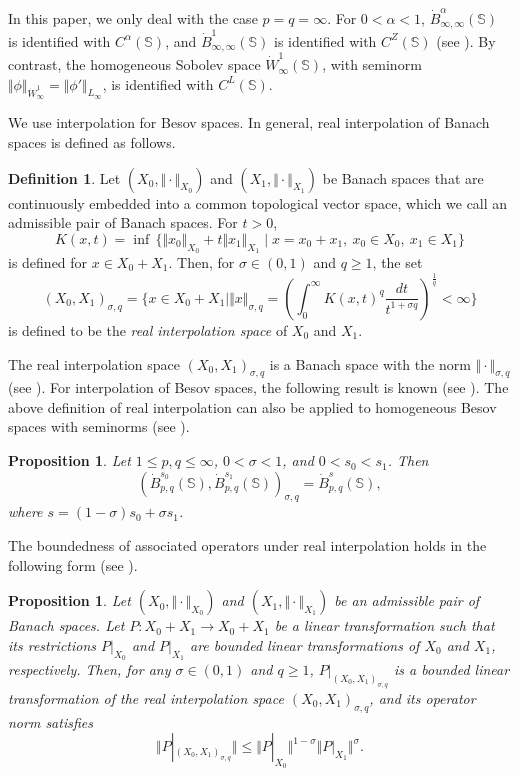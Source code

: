 \documentclass[amstex]{amsart}
\newtheorem{proposition}[theorem]{Proposition}
\theoremstyle{definition}
\newtheorem{definition}[theorem]{Definition}
\theoremstyle{remark}
\numberwithin{equation}{section}
\begin{document}
In this paper, we only deal with the case $p=q=\infty$. For $0<\alpha<1$, $\dot B^\alpha_{\infty,\infty}(\mathbb S)$ is
identified with $C^\alpha(\mathbb S)$, and $\dot B^1_{\infty,\infty}(\mathbb S)$ is
identified with $C^Z(\mathbb S)$ (see \cite[p.541]{Leo}). 
By contrast, the homogeneous Sobolev space $\dot W^1_\infty(\mathbb S)$,
with seminorm $\Vert \phi \Vert_{\dot W^1_\infty}=\Vert \phi' \Vert_{L_\infty}$, is identified with $C^L(\mathbb S)$. 

We use interpolation for Besov spaces.
In general, real interpolation of Banach spaces is defined as follows.

\begin{definition}
Let $(X_0, \Vert \cdot \Vert_{X_0})$ and $(X_1, \Vert \cdot \Vert_{X_1})$ 
be Banach spaces that are continuously embedded into a common topological vector space,
which we call an admissible pair of Banach spaces. For $t>0$, 
$$
K(x,t)=\inf\,\{\Vert x_0 \Vert_{X_0}+t\Vert x_1 \Vert_{X_1} \mid x=x_0+x_1,\ x_0 \in X_0,\ x_1 \in X_1\} 
$$
is defined for $x \in X_0+X_1$. Then, for $\sigma \in (0,1)$ and $q \geq 1$, the set
$$
(X_0,X_1)_{\sigma,q}=
\{x \in X_0 +X_1 \mid \Vert x \Vert_{\sigma,q}=\left( \int_0^\infty K(x,t)^q 
\frac{dt}{t^{1+\sigma q}} \right)^{\frac{1}{q}}<\infty\}
$$ 
is defined to be the {\it real interpolation space} of $X_0$ and $X_1$.
\end{definition}

The real interpolation space $(X_0,X_1)_{\sigma,q}$ is a Banach space with the norm $\Vert \cdot \Vert_{\sigma,q}$
(see \cite[Theorem 16.5]{Leo}). 
For interpolation of Besov spaces, the following result is known (see \cite[Corollary 17.42]{Leo}).
The above definition of real interpolation can also be applied to homogeneous Besov spaces with seminorms
(see \cite[Remark 17.31]{Leo}).

\begin{proposition}\label{Besov}
Let $1 \leq p,q\leq \infty$, $0<\sigma<1$, and $0<s_0<s_1$. Then
$$
(\dot B^{s_0}_{p,q}(\mathbb S),\dot B^{s_1}_{p,q}(\mathbb S))_{\sigma,q}=\dot B^{s}_{p,q}(\mathbb S),
$$
where $s=(1-\sigma)s_0+\sigma s_1$.
\end{proposition} 

The boundedness of associated operators under real interpolation holds in the following form (see \cite[Theorem 16.12]{Leo}).

\begin{proposition}\label{interpolation}
Let $(X_0, \Vert \cdot \Vert_{X_0})$ and $(X_1, \Vert \cdot \Vert_{X_1})$ 
be an admissible pair of Banach spaces. Let $P:X_0+X_1 \to X_0+X_1$ be a linear transformation
such that its restrictions $P|_{X_0}$ and $P|_{X_1}$ are bounded linear transformations
of $X_0$ and $X_1$, respectively. Then, for any $\sigma \in (0,1)$ and $q \geq 1$,
$P|_{(X_0,X_1)_{\sigma,q}}$ is a bounded linear transformation of
the real interpolation space $(X_0,X_1)_{\sigma,q}$, and its operator norm satisfies
$$
\Vert P|_{(X_0,X_1)_{\sigma,q}} \Vert \leq \Vert P|_{X_0} \Vert^{1-\sigma} \Vert P|_{X_1} \Vert^\sigma.
$$
\end{proposition}
\end{document}

